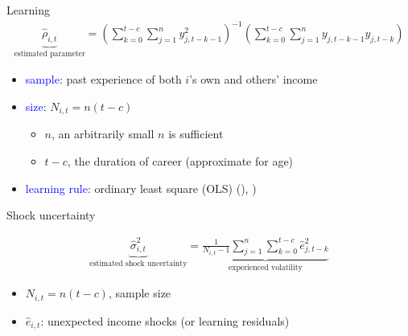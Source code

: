 \documentclass{beamer}
\begin{document}
\begin{frame}{Learning}
\begin{eqnarray}
\underbrace{\hat \rho_{i,t}}_{\text{estimated parameter}}= (\sum^{t-c}_{k=0}\sum^{n}_{j=1}y^2_{j,t-k-1})^{-1}(\sum^{t-c}_{k=0}\sum^{n}_{j=1}y_{j,t-k-1}y_{j,t-k})
\end{eqnarray}

	\begin{itemize}
		\item \textcolor{blue}{sample}: past experience of both $i$'s own and others' income
		\item \textcolor{blue}{size}:   $N_{i,t} = n (t-c)$
		\begin{itemize}
		\item $n$, an arbitrarily small $n$ is sufficient
		 \item $t-c$, the duration of career (approximate for age)   
		 \end{itemize}
		\item \textcolor{blue}{learning rule}: ordinary least square (OLS) (\cite{evans2012learning}), \cite{malmendier2015learning})
	\end{itemize} 
\end{frame}

\begin{frame}{Shock uncertainty}
	
	
\begin{eqnarray}
\underbrace{\widehat{\sigma}^2_{i,t}}_{\text{estimated shock uncertainty}}=  \underbrace{\frac{1}{N_{i,t}-1} \sum^{n}_{j=1}\sum^{t-c}_{k=0} \hat e_{j,t-k}^2}_{\text{experienced volatility}}
\end{eqnarray}

	\begin{itemize}
	\item $N_{i,t} = n (t-c)$, sample size
	\item $\hat e_{i,t}$: unexpected income shocks (or learning residuals)
\end{itemize} 
\end{frame}
\end{document}
